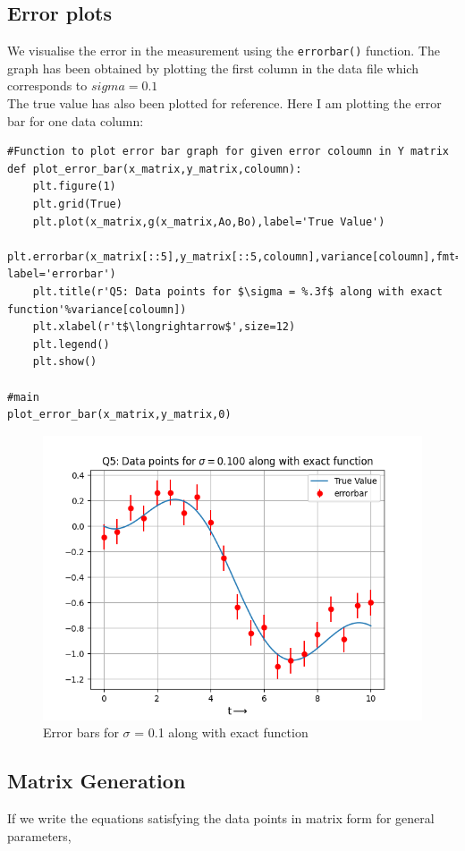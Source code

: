 \documentclass[11pt, a4paper]{article}
\begin{document}
\subsection{Error plots}
We visualise the error in the measurement using the \verb|errorbar()| function.
The graph has been obtained by plotting the first column in the data file which corresponds to $sigma = 0.1$\\
The true value has also been plotted for reference.
Here I am plotting the error bar for one data column:\\
\begin{lstlisting}
#Function to plot error bar graph for given error coloumn in Y matrix
def plot_error_bar(x_matrix,y_matrix,coloumn):
	plt.figure(1)
	plt.grid(True)
	plt.plot(x_matrix,g(x_matrix,Ao,Bo),label='True Value')
	plt.errorbar(x_matrix[::5],y_matrix[::5,coloumn],variance[coloumn],fmt='ro', label='errorbar')
	plt.title(r'Q5: Data points for $\sigma = %.3f$ along with exact function'%variance[coloumn])
	plt.xlabel(r't$\longrightarrow$',size=12)
	plt.legend()
	plt.show()

#main
plot_error_bar(x_matrix,y_matrix,0)
\end{lstlisting}
\begin{figure}[!tbh]
   	\centering
   	\includegraphics[scale=0.7]{Q5.png}  %
   	\caption{Error bars for $\sigma$ = 0.1 along with exact function}
   	\label{fig:Error bar}
   \end{figure}
   

\subsection{Matrix Generation}
\par If we write the equations satisfying the data points in matrix form for general parameters,
\end{document}
